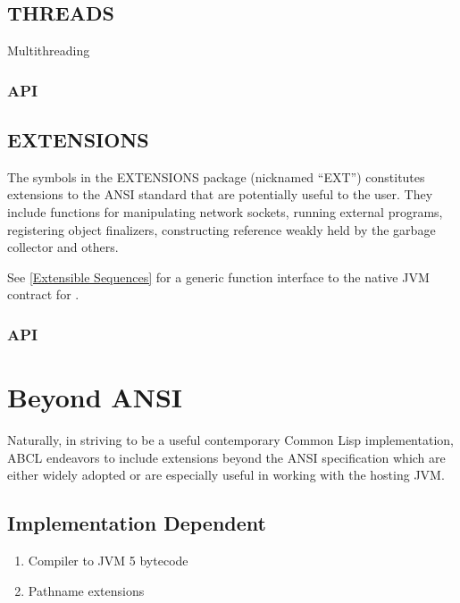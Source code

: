 \documentclass[10pt]{book}
\begin{document}


\section{THREADS}

Multithreading

\subsection{API}



\section{EXTENSIONS}

The symbols in the EXTENSIONS package (nicknamed ``EXT'') constitutes
extensions to the ANSI standard that are potentially useful to the
user.  They include functions for manipulating network sockets,
running external programs, registering object finalizers, constructing
reference weakly held by the garbage collector and others.

See \ref{Extensible Sequences} for a generic function interface to
the native JVM contract for .

\subsection{API}



\chapter{Beyond ANSI}

Naturally, in striving to be a useful contemporary Common Lisp
implementation, ABCL endeavors to include extensions beyond the ANSI
specification which are either widely adopted or are especially useful
in working with the hosting JVM.

\section{Implementation Dependent}
\begin{enumerate}
  \item Compiler to JVM 5 bytecode
  \item Pathname extensions
\end{enumerate}
\end{document}
